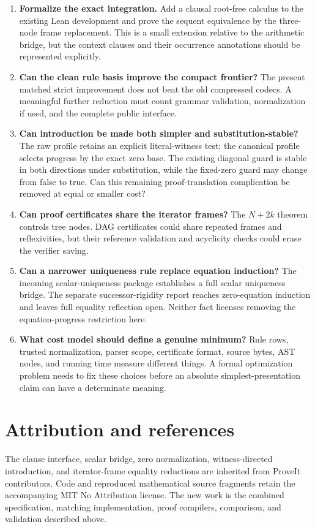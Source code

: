 \documentclass[11pt]{article}
\theoremstyle{definition}
\begin{document}
\begin{enumerate}
\item \textbf{Formalize the exact integration.} Add a clausal root-free
      calculus to the existing Lean development and prove the sequent
      equivalence by the three-node frame replacement. This is a small
      extension relative to the arithmetic bridge, but the context clauses
      and their occurrence annotations should be represented explicitly.
\item \textbf{Can the clean rule basis improve the compact frontier?}
      The present matched strict improvement does not beat the old compressed
      codecs. A meaningful further reduction must count grammar validation,
      normalization if used, and the complete public interface.
\item \textbf{Can introduction be made both simpler and substitution-stable?}
      The raw profile retains an explicit literal-witness test; the canonical
      profile selects progress by the exact zero base. The existing diagonal
      guard is stable in both directions under substitution, while the
      fixed-zero guard may change from false to true. Can this remaining
      proof-translation complication be removed at equal or smaller cost?
\item \textbf{Can proof certificates share the iterator frames?}
      The $N+2k$ theorem controls tree nodes. DAG certificates could share
      repeated frames and reflexivities, but their reference validation and
      acyclicity checks could erase the verifier saving.
\item \textbf{Can a narrower uniqueness rule replace equation induction?}
      The incoming scalar-uniqueness package establishes a full scalar
      uniqueness bridge. The separate successor-rigidity report reaches
      zero-equation induction and leaves full equality reflection open.
      Neither fact licenses removing the equation-progress restriction here.
\item \textbf{What cost model should define a genuine minimum?}
      Rule rows, trusted normalization, parser scope, certificate format,
      source bytes, AST nodes, and running time measure different things.
      A formal optimization problem needs to fix these choices before an
      absolute simplest-presentation claim can have a determinate meaning.
\end{enumerate}

\section*{Attribution and references}
The clause interface, scalar bridge, zero normalization, witness-directed
introduction, and iterator-frame equality reductions are inherited from
ProveIt contributors. Code and reproduced mathematical source fragments
retain the accompanying MIT No Attribution license. The new work is the
combined specification, matching implementation, proof compilers,
comparison, and validation described above.
\end{document}
